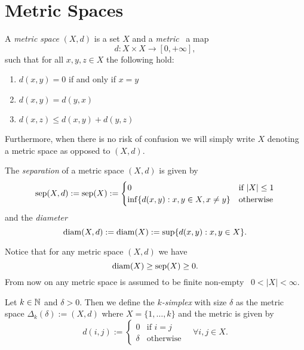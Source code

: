 \section{Metric Spaces}
\begin{definition}{}{}
A \emph{metric space} $(X,d)$ is a set $X$ and a \emph{metric} \ie\ a map
\begin{equation*}
d: X \times X \to [0, +\infty],
\end{equation*}
such that for all $x,y,z \in X$ the following hold:
\begin{enumerate}
    \item $d(x,y) = 0$ if and only if $x = y$
    \item $d(x,y) = d(y,x)$
    \item $d(x,z) \leq d(x,y) + d(y,z)$
\end{enumerate}
\end{definition}
Furthermore, when there is no risk of confusion we will simply write $X$ denoting a metric space as opposed to $(X,d)$.

\begin{definition}{}{}
The \emph{separation} of a metric space $(X,d)$ is given by
\begin{equation*}
\mathrm{sep}(X,d) := \mathrm{sep}(X) := \begin{cases}
    0 & \text{if } |X| \le 1\\
    \inf\{d(x,y): x,y \in X, x \neq y\} & \text{otherwise}
\end{cases}
\end{equation*}
and the \emph{diameter}
\begin{equation*}
\mathrm{diam}(X,d) := \mathrm{diam}(X) := \sup\{d(x,y): x,y \in X\}.
\end{equation*}
\end{definition}

Notice that for any metric space $(X,d)$ we have
$$
\mathrm{diam}(X) \geq \mathrm{sep}(X) \ge 0.
$$
From now on any metric space is assumed to be finite non-empty \ie\ $0 < |X| < \infty$.


\begin{definition}{}{}
    Let $k \in \mathbb N$ and $\delta > 0$. Then we define the \emph{$k$-simplex} with size $\delta$ as the metric space $\Delta_k(\delta) := (X,d)$ where $X = \{1, \dots, k\}$ and the metric is given by
    $$
    d(i,j) := \begin{cases}
        0 & \text{if } i = j\\
        \delta & \text{otherwise}
    \end{cases} \quad \forall i,j \in X.
    $$
\end{definition}